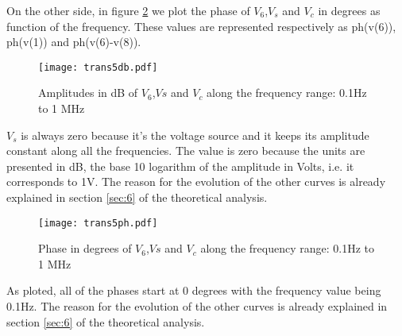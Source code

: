 On the other side, in figure \ref{fig:trans5ph} we plot the phase of $V_{6}$,$V_{s}$ and $V_{c}$ in degrees
as function of the frequency.
These values are represented respectively as ph(v(6)), ph(v(1)) and ph(v(6)-v(8)).


  \begin{figure}[ht] \centering
  \caption{Amplitudes in dB of $V_{6}$,$V{s}$ and $V_{c}$ along the frequency range: 0.1Hz to 1 MHz }
  \texttt{[image: trans5db.pdf]}
  \label{fig:trans5db}
  \end{figure}

  $V_{s}$ is always zero because it's the voltage source and it keeps its amplitude constant along
  all the frequencies. The value is zero because the units are presented in dB, the base 10 
  logarithm of the amplitude in Volts, i.e. it corresponds to 1V. The reason for the evolution of the other curves is already
  explained in section \ref{sec:6} of the theoretical analysis.

  \newpage

  \begin{figure}[ht] \centering
  \caption{Phase in degrees of $V_{6}$,$V{s}$ and $V_{c}$ along the frequency range: 0.1Hz to 1 MHz }
  \texttt{[image: trans5ph.pdf]}
  \label{fig:trans5ph}
  \end{figure}

  As ploted, all of the phases start at 0 degrees with the frequency value being 0.1Hz.
  The reason for the evolution of the other curves is already explained in section \ref{sec:6} of the theoretical analysis.

\newpage







